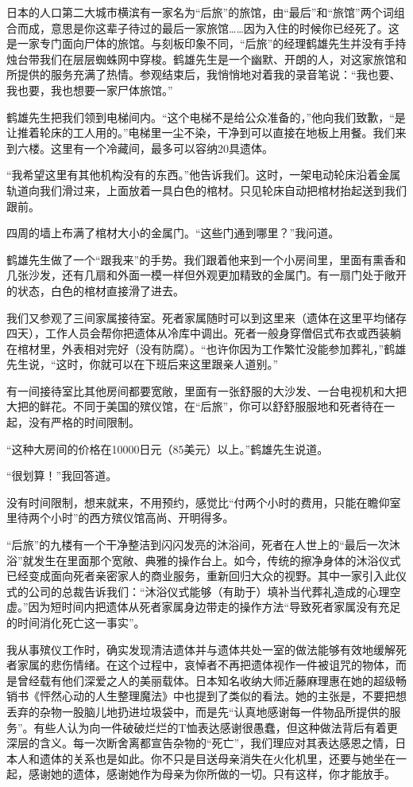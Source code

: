 \documentclass[12pt,oneside]{book}
\begin{document}
日本的人口第二大城市横滨有一家名为“后旅”的旅馆，由“最后”和“旅馆”两个词组合而成，意思是你这辈子待过的最后一家旅馆……因为入住的时候你已经死了。这是一家专门面向尸体的旅馆。与刻板印象不同，“后旅”的经理鹤雄先生并没有手持烛台带我们在层层蜘蛛网中穿梭。鹤雄先生是一个幽默、开朗的人，对这家旅馆和所提供的服务充满了热情。参观结束后，我悄悄地对着我的录音笔说：“我也要、我也要，我也想要一家尸体旅馆。”

鹤雄先生把我们领到电梯间内。“这个电梯不是给公众准备的，”他向我们致歉，“是让推着轮床的工人用的。”电梯里一尘不染，干净到可以直接在地板上用餐。我们来到六楼。这里有一个冷藏间，最多可以容纳20具遗体。

“我希望这里有其他机构没有的东西。”他告诉我们。这时，一架电动轮床沿着金属轨道向我们滑过来，上面放着一具白色的棺材。只见轮床自动把棺材抬起送到我们跟前。

四周的墙上布满了棺材大小的金属门。“这些门通到哪里？”我问道。

鹤雄先生做了一个“跟我来”的手势。我们跟着他来到一个小房间里，里面有熏香和几张沙发，还有几扇和外面一模一样但外观更加精致的金属门。有一扇门处于敞开的状态，白色的棺材直接滑了进去。

我们又参观了三间家属接待室。死者家属随时可以到这里来（遗体在这里平均储存四天），工作人员会帮你把遗体从冷库中调出。死者一般身穿僧侣式布衣或西装躺在棺材里，外表相对完好（没有防腐）。“也许你因为工作繁忙没能参加葬礼，”鹤雄先生说，“这时，你就可以在下班后来这里跟亲人道别。”

有一间接待室比其他房间都要宽敞，里面有一张舒服的大沙发、一台电视机和大把大把的鲜花。不同于美国的殡仪馆，在“后旅”，你可以舒舒服服地和死者待在一起，没有严格的时间限制。

“这种大房间的价格在10000日元（85美元）以上。”鹤雄先生说道。

“很划算！”我回答道。

没有时间限制，想来就来，不用预约，感觉比“付两个小时的费用，只能在瞻仰室里待两个小时”的西方殡仪馆高尚、开明得多。

“后旅”的九楼有一个干净整洁到闪闪发亮的沐浴间，死者在人世上的“最后一次沐浴”就发生在里面那个宽敞、典雅的操作台上。如今，传统的擦净身体的沐浴仪式已经变成面向死者亲密家人的商业服务，重新回归大众的视野。其中一家引入此仪式的公司的总裁告诉我们：“沐浴仪式能够（有助于）填补当代葬礼造成的心理空虚。”因为短时间内把遗体从死者家属身边带走的操作方法“导致死者家属没有充足的时间消化死亡这一事实”。

我从事殡仪工作时，确实发现清洁遗体并与遗体共处一室的做法能够有效地缓解死者家属的悲伤情绪。在这个过程中，哀悼者不再把遗体视作一件被诅咒的物体，而是曾经载有他们深爱之人的美丽载体。日本知名收纳大师近藤麻理惠在她的超级畅销书《怦然心动的人生整理魔法》中也提到了类似的看法。她的主张是，不要把想丢弃的杂物一股脑儿地扔进垃圾袋中，而是先“认真地感谢每一件物品所提供的服务”。有些人认为向一件破破烂烂的T恤表达感谢很愚蠢，但这种做法背后有着更深层的含义。每一次断舍离都宣告杂物的“死亡”，我们理应对其表达感恩之情，日本人和遗体的关系也是如此。你不只是目送母亲消失在火化机里，还要与她坐在一起，感谢她的遗体，感谢她作为母亲为你所做的一切。只有这样，你才能放手。
\end{document}
